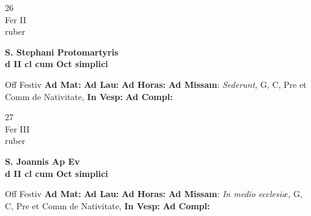 \documentclass[10pt, openany]{book}
\begin{document}
        \begin{center}
            \begin{minipage}{3.5in}
                \vspace{2em}
                \begin{minipage}{0.5in}
                    {\Huge 26} \\
                    {\normalsize Fer II} \\
                    {\normalsize ruber}
                \end{minipage}
                \begin{minipage}{3.0in}
                    \textbf{ \large S. Stephani Protomartyris \\
                    \textnormal{\normalsize d II cl cum Oct simplici}} \\ 
                \end{minipage}
                \begin{justify}Off Festiv
                    \textbf{Ad Mat: }
                    \textbf{Ad Lau: }
                    \textbf{Ad Horas: }\textbf{Ad Missam}: \textit{Sederunt,} G, C, Pre et Comm de Nativitate,  
                    \textbf{In Vesp: }
                    \textbf{Ad Compl: }
                \end{justify}
            \end{minipage}
        \end{center}
    
        \begin{center}
            \begin{minipage}{3.5in}
                \vspace{2em}
                \begin{minipage}{0.5in}
                    {\Huge 27} \\
                    {\normalsize Fer III} \\
                    {\normalsize ruber}
                \end{minipage}
                \begin{minipage}{3.0in}
                    \textbf{ \large S. Joannis Ap Ev \\
                    \textnormal{\normalsize d II cl cum Oct simplici}} \\ 
                \end{minipage}
                \begin{justify}Off Festiv
                    \textbf{Ad Mat: }
                    \textbf{Ad Lau: }
                    \textbf{Ad Horas: }\textbf{Ad Missam}: \textit{In medio ecclesiæ,} G, C, Pre et Comm de Nativitate,  
                    \textbf{In Vesp: }
                    \textbf{Ad Compl: }
                \end{justify}
            \end{minipage}
        \end{center}
    
\end{document}
